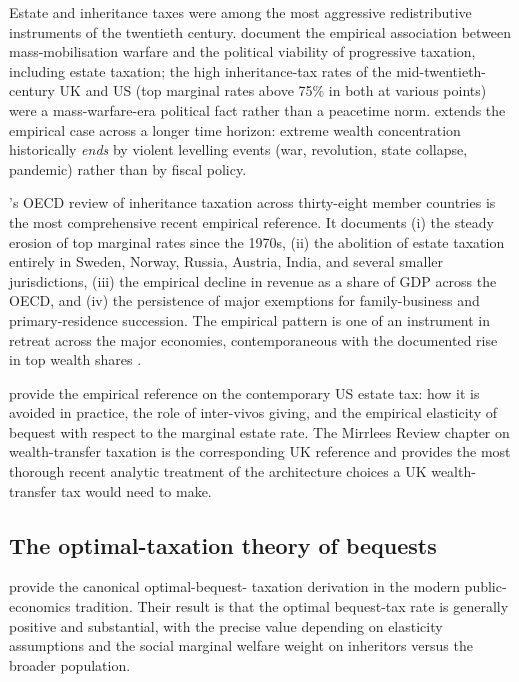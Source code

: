 \documentclass[11pt]{article}
\begin{document}
Estate and inheritance taxes were among the most aggressive
redistributive instruments of the twentieth century.
\citet{scheve2009scheidel} document the empirical association
between mass-mobilisation warfare and the political viability of
progressive taxation, including estate taxation; the high
inheritance-tax rates of the mid-twentieth-century UK and US (top
marginal rates above 75\% in both at various points) were a
mass-warfare-era political fact rather than a peacetime norm.
\citet{scheidel2017leveler} extends the empirical case across a
longer time horizon: extreme wealth concentration historically
\emph{ends} by violent levelling events (war, revolution, state
collapse, pandemic) rather than by fiscal policy.

\citet{oecd2021inheritance}'s OECD review of inheritance taxation
across thirty-eight member countries is the most comprehensive
recent empirical reference.  It documents (i) the steady erosion of
top marginal rates since the 1970s, (ii) the abolition of estate
taxation entirely in Sweden, Norway, Russia, Austria, India, and
several smaller jurisdictions, (iii) the empirical decline in
revenue as a share of GDP across the OECD, and (iv) the persistence
of major exemptions for family-business and primary-residence
succession.  The empirical pattern is one of an instrument in retreat
across the major economies, contemporaneous with the documented rise
in top wealth shares \citep{saez2019triumph, piketty2020capital}.

\citet{kopczuk2003bequest, kopczuk2013taxation} provide the
empirical reference on the contemporary US estate tax: how it is
avoided in practice, the role of inter-vivos giving, and the
empirical elasticity of bequest with respect to the marginal estate
rate.  The Mirrlees Review \citep{mirrlees2011tax} chapter on
wealth-transfer taxation \citep{boadway2010taxation} is the
corresponding UK reference and provides the most thorough recent
analytic treatment of the architecture choices a UK wealth-transfer
tax would need to make.

\subsection{The optimal-taxation theory of bequests}

\citet{piketty2013theory} provide the canonical optimal-bequest-
taxation derivation in the modern public-economics tradition.
Their result is that the optimal bequest-tax rate is generally
positive and substantial, with the precise value depending on
elasticity assumptions and the social marginal welfare weight on
inheritors versus the broader population.
\end{document}
